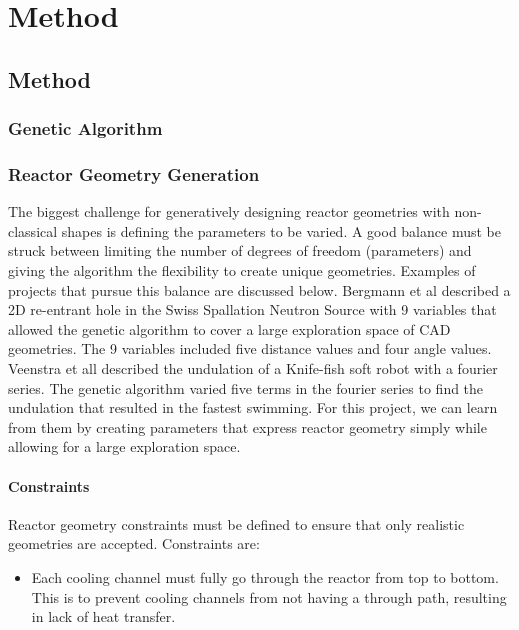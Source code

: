 \chapter{Method}

\section{Method}

\subsection{Genetic Algorithm}

\subsection{Reactor Geometry Generation}
The biggest challenge for generatively designing reactor geometries with 
non-classical shapes is defining the parameters to be varied. 
A good balance must be struck between limiting the number of degrees of freedom 
(parameters) and giving the algorithm the flexibility to create unique geometries.
Examples of projects that pursue this balance are discussed below. 
Bergmann et al \cite{bergmann_simulation_2018} described a 2D re-entrant hole 
in the Swiss Spallation Neutron Source with 9 variables that allowed the genetic 
algorithm to cover a large exploration space of CAD geometries. 
The 9 variables included five distance values and four angle values. 
Veenstra et all \cite{veenstra_evolution_2018} described the undulation of 
a Knife-fish soft robot with a fourier series. 
The genetic algorithm varied five terms in the fourier series to find the undulation 
that resulted in the fastest swimming. 
For this project, we can learn from them by creating parameters that
express reactor geometry simply while allowing for a large exploration space. 

\subsubsection{Constraints}
Reactor geometry constraints must be defined to ensure that only realistic 
geometries are accepted. 
Constraints are: 
\begin{itemize}
    \item Each cooling channel must fully go through the reactor from top to 
    bottom. This is to prevent cooling channels from not having a through 
    path, resulting in lack of heat transfer. 
\end{itemize}

